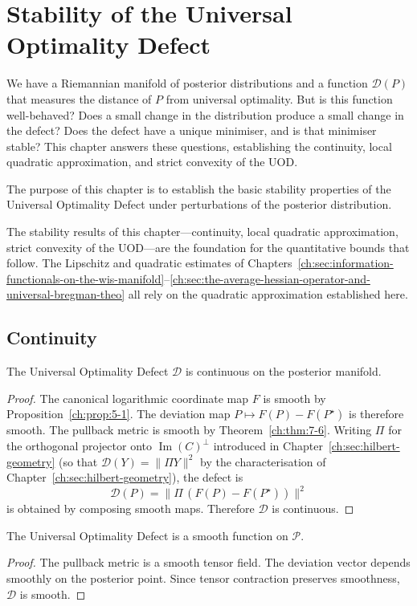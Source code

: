 \chapter[Stability of the UOD]{Stability of the Universal Optimality Defect}\label{ch:sec:stability-of-the-universal-optimality-defect}


We have a Riemannian manifold of posterior distributions and a function
$\mathcal D(P)$ that measures the distance of $P$ from universal
optimality.  But is this function well-behaved?  Does a small change in
the distribution produce a small change in the defect?  Does the defect
have a unique minimiser, and is that minimiser stable?  This chapter
answers these questions, establishing the continuity, local quadratic
approximation, and strict convexity of the UOD.

The purpose of this chapter is to establish the basic stability properties of the Universal Optimality Defect under perturbations of the posterior distribution.

The stability results of this chapter---continuity, local quadratic approximation, strict convexity of the UOD---are the foundation for the quantitative bounds that follow. The Lipschitz and quadratic estimates of Chapters~\ref{ch:sec:information-functionals-on-the-wis-manifold}--\ref{ch:sec:the-average-hessian-operator-and-universal-bregman-theo} all rely on the quadratic approximation established here.

\section{Continuity}\label{ch:sec:continuity-stability}
\begin{proposition}[Continuity]
\label{ch:prop:9-1}
The Universal Optimality Defect
$\mathcal D$
is continuous on the posterior manifold.
\end{proposition}
\begin{proof}
The canonical logarithmic coordinate map
$F$
is smooth by Proposition~\ref{ch:prop:5-1}.
The deviation map
$P\longmapsto F(P)-F(P^\star)$
is therefore smooth.
The pullback metric is smooth by Theorem~\ref{ch:thm:7-6}.
Writing \(\Pi\) for the orthogonal projector onto
\(\operatorname{Im}(C)^\perp\) introduced in
Chapter~\ref{ch:sec:hilbert-geometry} (so that
\(\mathcal D(Y)=\|\Pi Y\|^2\) by the characterisation of
Chapter~\ref{ch:sec:hilbert-geometry}), the defect is
\[
\mathcal D(P)
=
\|\Pi\,(F(P)-F(P^\star))\|^2
\]
is obtained by composing smooth maps.
Therefore
$\mathcal D$
is continuous. 
\end{proof}
\begin{proposition}[Smoothness]\label{ch:prop:9-2}

The Universal Optimality Defect is a smooth function on
$\mathcal P.$
\end{proposition}
\begin{proof}
The pullback metric is a smooth tensor field.
The deviation vector depends smoothly on the posterior point.
Since tensor contraction preserves smoothness,
$\mathcal D$
is smooth. 
\end{proof}




